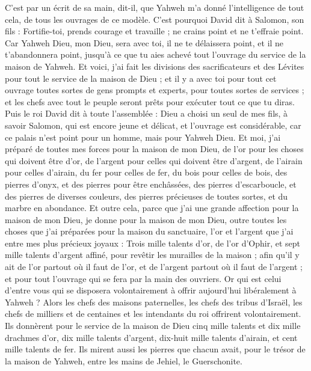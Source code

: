 \begin{multicols}{2}
C’est par un écrit de sa main, dit-il, que Yahweh m’a donné l'intelligence de tout cela, de tous les ouvrages de ce modèle.
C'est pourquoi David dit à Salomon, son fils : Fortifie-toi, prends courage et travaille ; ne crains point et ne t'effraie point. Car Yahweh Dieu, mon Dieu, sera avec toi, il ne te délaissera point, et il ne t'abandonnera point, jusqu'à ce que tu aies achevé tout l'ouvrage du service de la maison de Yahweh.
Et voici, j'ai fait les divisions des sacrificateurs et des Lévites pour tout le service de la maison de Dieu ; et il y a avec toi pour tout cet ouvrage toutes sortes de gens prompts et experts, pour toutes sortes de services ; et les chefs avec tout le peuple seront prêts pour exécuter tout ce que tu diras.
\VerseOne{}Puis le roi David dit à toute l'assemblée : Dieu a choisi un seul de mes fils, à savoir Salomon, qui est encore jeune et délicat, et l'ouvrage est considérable, car ce palais n'est point pour un homme, mais pour Yahweh Dieu.
Et moi, j'ai préparé de toutes mes forces pour la maison de mon Dieu, de l'or pour les choses qui doivent être d'or, de l'argent pour celles qui doivent être d'argent, de l'airain pour celles d'airain, du fer pour celles de fer, du bois pour celles de bois, des pierres d'onyx, et des pierres pour être enchâssées, des pierres d'escarboucle, et des pierres de diverses couleurs, des pierres précieuses de toutes sortes, et du marbre en abondance.
Et outre cela, parce que j'ai une grande affection pour la maison de mon Dieu, je donne pour la maison de mon Dieu, outre toutes les choses que j'ai préparées pour la maison du sanctuaire, l'or et l'argent que j'ai entre mes plus précieux joyaux :
Trois mille talents d'or, de l'or d'Ophir, et sept mille talents d'argent affiné, pour revêtir les murailles de la maison ;
afin qu'il y ait de l'or partout où il faut de l'or, et de l'argent partout où il faut de l'argent ; et pour tout l'ouvrage qui se fera par la main des ouvriers. Or qui est celui d'entre vous qui se disposera volontairement à offrir aujourd'hui libéralement à Yahweh ?
Alors les chefs des maisons paternelles, les chefs des tribus d'Israël, les chefs de milliers et de centaines et les intendants du roi offrirent volontairement.
Ils donnèrent pour le service de la maison de Dieu cinq mille talents et dix mille drachmes d'or, dix mille talents d'argent, dix-huit mille talents d'airain, et cent mille talents de fer.
Ils mirent aussi les pierres que chacun avait, pour le trésor de la maison de Yahweh, entre les mains de Jehiel, le Guerschonite.

\end{multicols}
